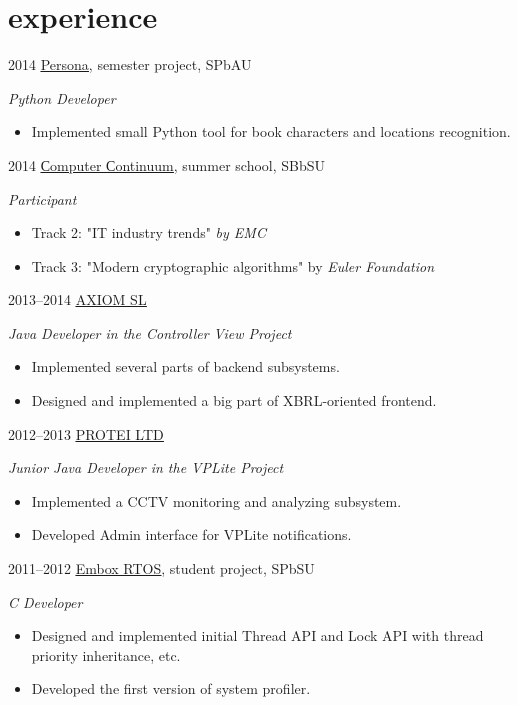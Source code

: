 \documentclass[]{friggeri-cv} %
\begin{document}
\section{experience}

\begin{entrylist}
\entry
{2014}
{\href{https://github.com/nunberty/chars-movement-graph}{\underline{Persona}}, semester project, SPbAU}
{}
{\emph{Python Developer}
    \begin{itemize}
        \item
        Implemented small Python tool for book characters and locations recognition.
    \end{itemize}
}
\entry
{2014}
{\href{http://spbsu-school.org/}{\underline{Сomputer Сontinuum}}, summer school, SBbSU}
{}
{\emph{Participant}
    \begin{itemize}
        \item
        Track 2: "IT industry trends" \textit{by EMC}
        \item
        Track 3: "Modern cryptographic algorithms" by \textit{Euler Foundation}
    \end{itemize}
}
\entry
{2013--2014}
{\href{http://axiomsl.com}{\underline{AXIOM SL}}}
{}
{\emph{Java Developer in the Controller View Project}

    \begin{itemize}
    \item
        Implemented several parts of backend subsystems.
    \item
        Designed and implemented
        a big part of XBRL-oriented frontend.
    \end{itemize}
}
\entry
{2012--2013}
{\href{http://protei.com}{\underline{PROTEI LTD}}}
{}
{\emph{Junior Java Developer in the VPLite Project}
    \begin{itemize}
        \item
        Implemented a CCTV monitoring and analyzing subsystem.
        \item
        Developed Admin interface for VPLite notifications.
    \end{itemize}
}
\entry
{2011--2012}
{\href{https://code.google.com/p/embox}{\underline{Embox RTOS}}, student project, SPbSU}
{}
{\emph{C Developer}
    \begin{itemize}
        \item
        Designed and implemented initial Thread API and Lock API with thread priority inheritance, etc.
        \item
        Developed the first version of system profiler.
    \end{itemize}
}
\end{entrylist}
\end{document}
